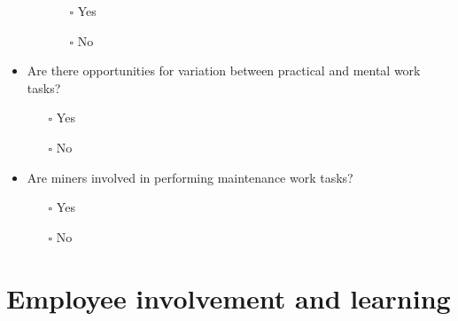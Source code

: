 \documentclass[
  12pt,
]{scrbook}
\providecommand{\tightlist}{%
  \setlength{\itemsep}{0pt}\setlength{\parskip}{0pt}}
\begin{document}
\begin{itemize}
\begin{itemize}
    \begin{itemize}
    \tightlist
    \item[$\square$]
      Yes
    \item[$\square$]
      No
    \end{itemize}
  \end{itemize}
\item
  Are there opportunities for variation between practical and mental work tasks?

  \begin{itemize}
  \tightlist
  \item[$\square$]
    Yes
  \item[$\square$]
    No
  \end{itemize}
\item
  Are miners involved in performing maintenance work tasks?

  \begin{itemize}
  \tightlist
  \item[$\square$]
    Yes
  \item[$\square$]
    No
  \end{itemize}
\end{itemize}

\hypertarget{employee-involvement-and-learning}{%
\section*{Employee involvement and learning}\label{employee-involvement-and-learning}}
\end{document}
